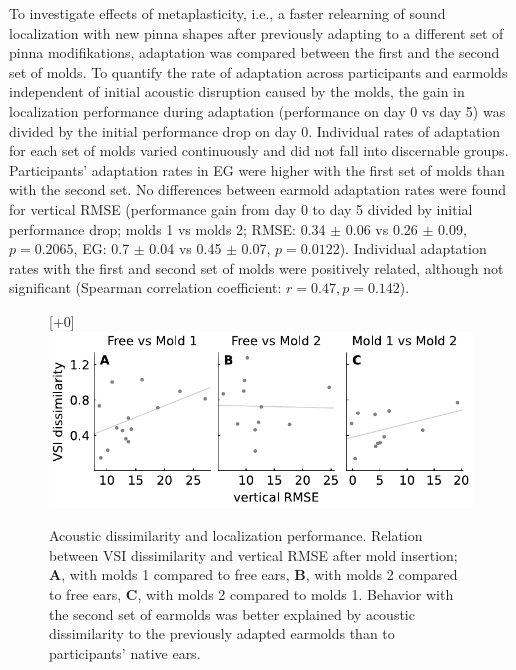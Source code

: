 To investigate effects of metaplasticity, i.e., a faster relearning of sound localization with new pinna shapes after previously adapting to a different set of pinna modifikations, adaptation was compared between the first and the second set of molds. To quantify the rate of adaptation across participants and earmolds independent of initial acoustic disruption caused by the molds, the gain in localization performance during adaptation (performance on day 0 vs day 5) was divided by the initial performance drop on day 0. Individual rates of adaptation for each set of molds varied continuously and did not fall into discernable groups. Participants' adaptation rates in EG were higher with the first set of molds than with the second set. No differences between earmold adaptation rates were found for vertical RMSE (performance gain from day 0 to day 5 divided by initial performance drop; molds 1 vs molds 2; RMSE: 0.34 $\pm$ 0.06 vs 0.26 $\pm$ 0.09, $p = 0.2065$, EG: 0.7 $\pm$ 0.04 vs 0.45 $\pm$ 0.07, $p = 0.0122$). Individual adaptation rates with the first and second set of molds were positively related, although not significant (Spearman correlation coefficient: $r = 0.47, p = 0.142$). 

 \begin{figure}
\centering
    \raisebox{0pt}[\dimexpr\height+0\baselineskip\relax]{
        \includegraphics[width=12cm]{../Results/figures/fig6/fig6}}
	\caption{Acoustic dissimilarity and localization performance. Relation between VSI dissimilarity and vertical RMSE after mold insertion; \textbf{A}, with molds 1 compared to free ears, \textbf{B}, with molds 2 compared to free ears, \textbf{C}, with molds 2 compared to molds 1. Behavior with the second set of earmolds was better explained by acoustic dissimilarity to the previously adapted earmolds than to participants' native ears.}
	\label{fig:vsi_dis_rmse}
\end{figure}
\noindent\vspace{-1\baselineskip}


